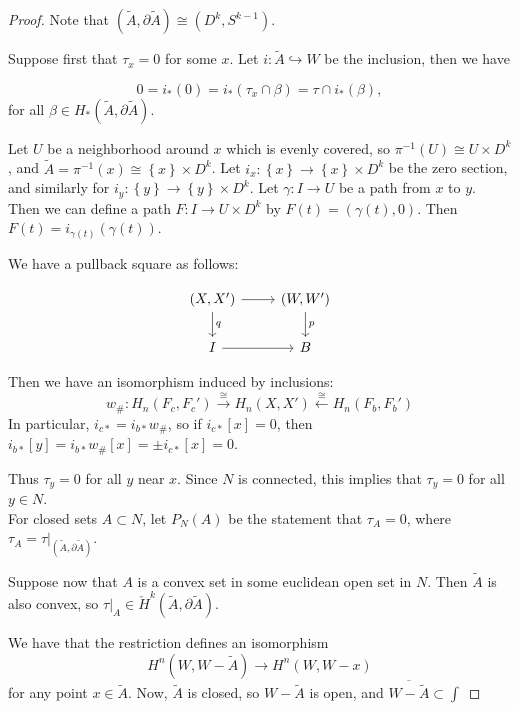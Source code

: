 \documentclass[reqno]{amsart}
\theoremstyle{definition}
\theoremstyle{remark}
\begin{document}
\begin{proof}
    Note that 
    $\left( \tilde{A}, \partial \tilde{A} \right) 
    \cong \left( D^{k}, S^{k-1} \right) $.

    Suppose first that $\tau_x = 0$ for some $x$.
    Let $i \colon \tilde{A} \hookrightarrow 
    W$ be the inclusion, then we have

    \[
    0 = i_* (0) = i_* \left( \tau_x \cap \beta \right) =
    \tau \cap i_* \left( \beta \right) ,
    \] 
    for all $\beta \in H_* \left( \tilde{A},
    \partial \tilde{A}\right) $.

    Let 
    $U$ be a neighborhood around $x$ which is evenly covered, so
    $\pi^{-1}(U) \cong U \times D^{k}$, and
    $\tilde{A} = \pi^{-1}(x) \cong \left\{ x \right\} \times D^{k}$.
    Let $i_x \colon \left\{ x \right\} \to 
    \left\{ x \right\} \times D^{k}$ be the zero section, and
    similarly for $i_y \colon \left\{ y \right\} \to 
    \left\{ y \right\} \times D^{k}$. Let
    $\gamma \colon I \to U$ be a path from $x$ to $y$.
    Then
    we can define a path
    $F \colon I \to 
    U \times D^{k}$ by
    $F(t) = (\gamma(t),0) $. Then
    $F (t) = i_{\gamma(t)} (\gamma(t))$.

    We have a pullback square as follows:

    \begin{equation*}
    \begin{tikzcd}
        (X,X') \ar[d, "q"] \ar[r] & (W,W') \ar[d, "p"] \\
        I \ar[r] & B
    \end{tikzcd}
    \end{equation*}
    
    Then we have an isomorphism
    induced by inclusions:
    \[
    w_{\#} \colon H_{n} 
    \left( F_c, F_c' \right) \stackrel{\cong}{\to } 
    H_{n}(X,X') \stackrel{\cong}{\leftarrow} H_{n}(F_b,F_b')
    \] 
    In particular,
    $i_{c*} = i_{b*} w_{\#}$, so
    if $i_{c*}\left[ x \right] = 0$, then
    $i_{b*} \left[ y \right] = i_{b*} w_{\#}\left[ x \right] = 
     \pm i_{c*} \left[ x \right] = 0 $.

     Thus $\tau_y = 0$ for all $y$ near $x$. Since
     $N$ is connected, this implies that
     $\tau_y = 0$ for all $y \in N$.\\

     For closed sets $A \subset N$, let
     $P_N (A)$ be the statement that
     $\tau_A = 0$, where
     $\tau_A = \tau|_{\left( \tilde{A}, \partial \tilde{A} \right) }$.

     Suppose now that $A$ is a convex set in some euclidean 
     open set in $N$. 
     Then $\tilde{A}$ is also convex, so
     $\tau|_A \in \check{H}^{k}(\tilde{A}, \partial \tilde{A}) $.
     
     We have that the restriction defines an isomorphism
     \[
     H^{n} \left( W, W-\tilde{A} \right) 
     \to H^{n} \left( W, W - x \right) 
     \] 
     for any point $x \in \tilde{A}$.
     Now, $\tilde{A}$ is closed, so $W - \tilde{A}$ is open, and
     $\overline{W - \tilde{A}} 
     \subset \int $
    

    



\end{proof}
\end{document}
